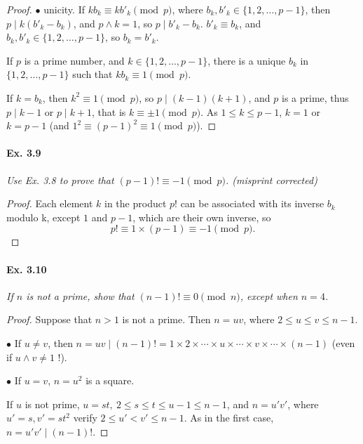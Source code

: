 \documentclass[11pt,a4paper]{article}
\begin{document}
{\begin{proof}
$\bullet$ unicity. If $kb_k \equiv kb'_k \pmod p$, where $b_k,b'_k \in \{1,2,\ldots,p-1\}$, then $p \mid k(b'_k-b_k)$, and $p \wedge k = 1$, so $p \mid b'_k-b_k$. $b'_k \equiv b_k$, and $b_k,b'_k \in \{1,2,\ldots,p-1\}$, so $b_k = b'_k$.

If $p$ is a prime number, and $k \in \{1, 2, \ldots, p - 1\}$, there is a unique $b_k$ in $\{1,2,\ldots,p-1\}$ such that $kb_k \equiv 1 \pmod p$.

\medskip

If $k = b_k$, then $k^2 \equiv 1 \pmod p$, so $p \mid (k-1)(k+1)$, and $p$ is a prime, thus $p \mid k-1$ or $p \mid k+1$, that is $k \equiv \pm 1 \pmod p$. 
As $1 \leq k \leq p-1$, $k = 1$ or $k = p-1$ (and $1^2 \equiv (p-1)^2 \equiv 1 \pmod p$).
\end{proof}

\paragraph{Ex. 3.9}

{\it Use Ex. 3.8 to prove that $(p - 1)! \equiv -1 \pmod p$. (misprint corrected)
}

\begin{proof}
Each element $k$ in the product $p!$ can be associated with its inverse $b_k$ modulo k, except $1$ and $p-1$, which are their own inverse, so
$$p! \equiv 1\times (p-1) \equiv -1 \pmod p.$$
\end{proof}

\paragraph{Ex. 3.10}

{\it If $n$ is not a prime, show that $(n - 1)! \equiv 0 \pmod n$, except when $n = 4$.
}

\begin{proof}

Suppose that $n >1$ is not a prime. Then $n = uv$, where $2 \leq u \leq v \leq n-1$.

$\bullet$ If $u \neq v$, then $n = uv \mid (n-1)! = 1\times 2 \times\cdots \times u \times\cdots \times v \times \cdots \times (n-1)$ (even if $u\wedge v \neq 1$ !).

$\bullet$ If $u=v$, $n = u^2$ is a square.

If $u$ is not prime, $u =st,\ 2\leq s \leq t \leq u-1 \leq n-1$, and $n = u' v'$, where $u' =s,v' =st^2$ verify  $2 \leq u' < v' \leq n-1$. As in the first case, $n = u'v' \mid (n-1)!$.  


\end{proof}}
\end{document}
